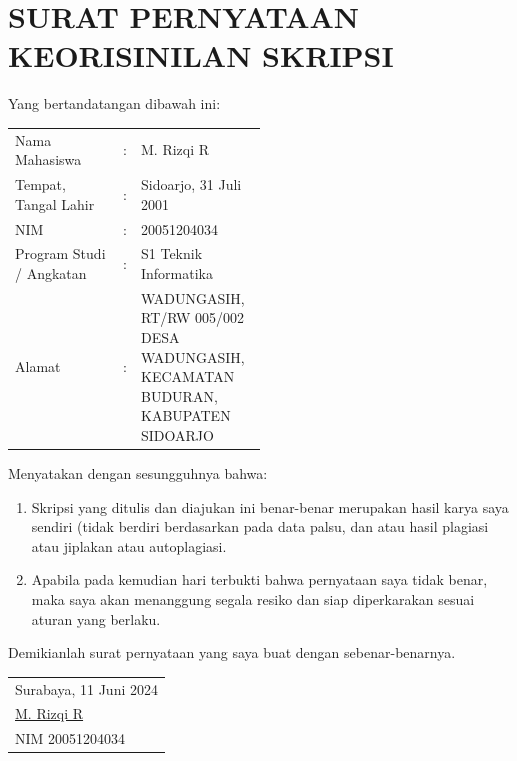 \documentclass[10pt,]{report}
\begin{document}
\chapter*{SURAT PERNYATAAN KEORISINILAN SKRIPSI}
\begin{adjustwidth}{0pt}{}

	Yang bertandatangan dibawah ini:\\

	\noindent
	\begin{tabular}{@{}lcp{0.5\linewidth}}
		Nama Mahasiswa           & : & M. Rizqi R                                                                                    \\
		Tempat, Tangal Lahir     & : & Sidoarjo, 31 Juli 2001                                                                        \\
		NIM                      & : & 20051204034                                                                                   \\
		Program Studi / Angkatan & : & S1 Teknik Informatika                                                                         \\
		Alamat                   & : & \raggedright WADUNGASIH, RT/RW 005/002 DESA WADUNGASIH, KECAMATAN BUDURAN, KABUPATEN SIDOARJO \\
	\end{tabular}

	\noindent
	Menyatakan dengan sesungguhnya bahwa:
	\begin{enumerate}
		\item Skripsi yang ditulis dan diajukan ini benar-benar merupakan hasil
		      karya saya sendiri (tidak berdiri berdasarkan pada data palsu, dan atau
		      hasil plagiasi atau jiplakan atau autoplagiasi.
		\item Apabila pada kemudian hari terbukti bahwa pernyataan saya tidak
		      benar, maka saya akan menanggung segala resiko dan siap diperkarakan
		      sesuai aturan yang berlaku.
	\end{enumerate}

	\noindent
	Demikianlah surat pernyataan yang saya buat dengan sebenar-benarnya.

	\vspace{1cm}

	\begin{adjustwidth}{170pt}{}
		\begin{tabular}{@{}l}
			Surabaya, 11 Juni 2024
			\vspace{2cm}
			\\
			\underline{M. Rizqi R} \\
			NIM 20051204034        \\
		\end{tabular}
	\end{adjustwidth}
\end{adjustwidth}
\end{document}
